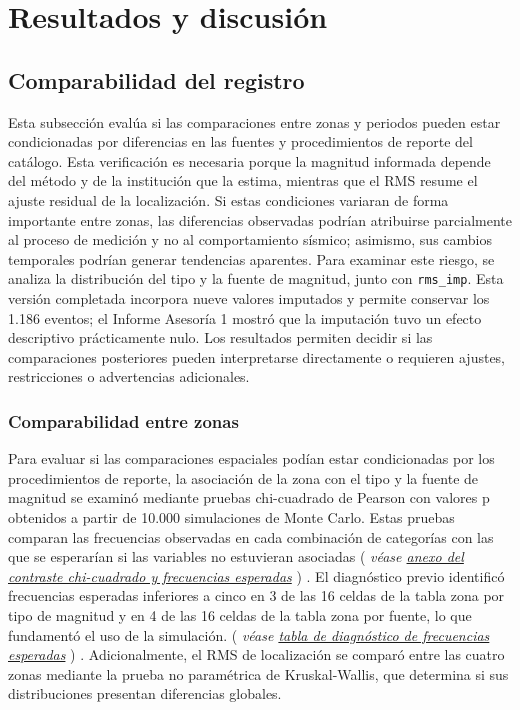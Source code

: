 \documentclass[
  spanish,
  letterpaper,
  DIV=11,
  numbers=noendperiod]{scrartcl}
\newcommand{\asesoriaParenRef}[1]{%
  \textnormal{\textcolor{asesoriaTextColor}{(}}%
  {\hypersetup{linkcolor=asesoriaLinkColor,urlcolor=asesoriaLinkColor,citecolor=asesoriaLinkColor}\textcolor{asesoriaTextColor}{\emph{#1}}}%
  \textnormal{\textcolor{asesoriaTextColor}{)}}%
}
\begin{document}
\section{Resultados y discusión}\label{resultados-y-discusiuxf3n}

\subsection{Comparabilidad del registro}\label{sec-res-comparabilidad}

Esta subsección evalúa si las comparaciones entre zonas y periodos
pueden estar condicionadas por diferencias en las fuentes y
procedimientos de reporte del catálogo. Esta verificación es necesaria
porque la magnitud informada depende del método y de la institución que
la estima, mientras que el RMS resume el ajuste residual de la
localización. Si estas condiciones variaran de forma importante entre
zonas, las diferencias observadas podrían atribuirse parcialmente al
proceso de medición y no al comportamiento sísmico; asimismo, sus
cambios temporales podrían generar tendencias aparentes. Para examinar
este riesgo, se analiza la distribución del tipo y la fuente de
magnitud, junto con \texttt{rms\_imp}. Esta versión completada incorpora
nueve valores imputados y permite conservar los 1.186 eventos; el
Informe Asesoría 1 mostró que la imputación tuvo un efecto descriptivo
prácticamente nulo. Los resultados permiten decidir si las comparaciones
posteriores pueden interpretarse directamente o requieren ajustes,
restricciones o advertencias adicionales.

\subsubsection{Comparabilidad entre
zonas}\label{comparabilidad-entre-zonas}

Para evaluar si las comparaciones espaciales podían estar condicionadas
por los procedimientos de reporte, la asociación de la zona con el tipo
y la fuente de magnitud se examinó mediante pruebas chi-cuadrado de
Pearson con valores p obtenidos a partir de 10.000 simulaciones de Monte
Carlo. Estas pruebas comparan las frecuencias observadas en cada
combinación de categorías con las que se esperarían si las variables no
estuvieran asociadas
\asesoriaParenRef{véase \hyperref[sec-anexo-chi-esperadas]{anexo del contraste chi-cuadrado y frecuencias esperadas}}.
El diagnóstico previo identificó frecuencias esperadas inferiores a
cinco en 3 de las 16 celdas de la tabla zona por tipo de magnitud y en 4
de las 16 celdas de la tabla zona por fuente, lo que fundamentó el uso
de la simulación.
\asesoriaParenRef{véase \hyperref[tbl-diagnostico-esperadas]{tabla de diagnóstico de frecuencias esperadas}}.
Adicionalmente, el RMS de localización se comparó entre las cuatro zonas
mediante la prueba no paramétrica de Kruskal-Wallis, que determina si
sus distribuciones presentan diferencias globales.
\end{document}
